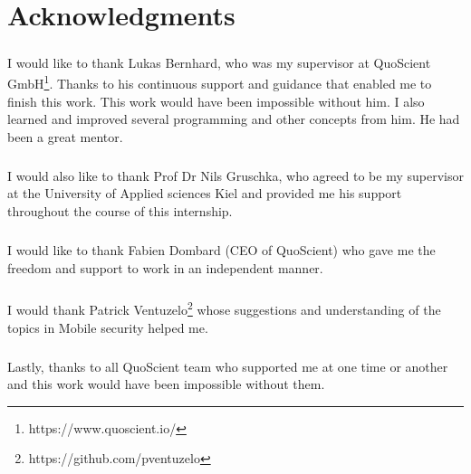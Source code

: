 \documentclass[../main.tex]{subfile}
\begin{document}
\chapter*{\centering Acknowledgments}

\paragraph{} I would like to thank Lukas Bernhard, who was my supervisor at QuoScient GmbH\footnote{https://www.quoscient.io/}. Thanks to his continuous support and guidance that enabled me to finish this work. This work would have been impossible without him. I also learned and improved several programming and other concepts from him. He had been a great mentor.
\paragraph{} I would also like to thank Prof Dr Nils Gruschka, who agreed to be my supervisor at the University of Applied sciences Kiel and provided me his support throughout the course of this internship.
\paragraph{} I would like to thank Fabien Dombard (CEO of QuoScient) who gave me the freedom and support to work in an independent manner.
\paragraph{} I would thank Patrick Ventuzelo\footnote{https://github.com/pventuzelo} whose suggestions and understanding of the topics in Mobile security helped me.
\paragraph{} Lastly, thanks to all QuoScient team who supported me at one time or another and this work would have been impossible without them.
\end{document}
